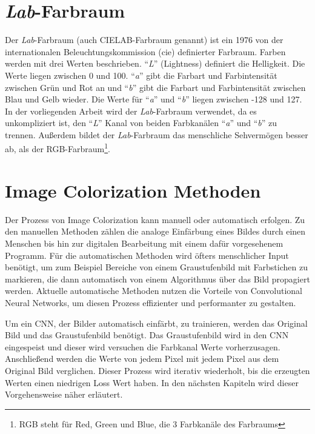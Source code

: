 \section{\textit{Lab}-Farbraum}
Der \textit{Lab}-Farbraum (auch CIELAB-Farbraum genannt) ist ein 1976 von der internationalen
Beleuchtungskommission (\gls{cie}) definierter Farbraum. Farben werden mit drei Werten beschrieben. ``\textit{L}'' (Lightness) definiert die Helligkeit.
Die Werte liegen zwischen 0 und 100. ``\textit{a}'' gibt die Farbart und Farbintensität zwischen Grün und Rot an und ``\textit{b}'' gibt die
Farbart und Farbintensität zwischen Blau und Gelb wieder. Die Werte für ``\textit{a}'' und ``\textit{b}'' liegen zwischen -128 und 127.
\\
In der vorliegenden Arbeit wird der \textit{Lab}-Farbraum verwendet, da es unkompliziert ist, den ``\textit{L}'' Kanal von beiden Farbkanälen
``\textit{a}'' und ``\textit{b}'' zu trennen. Außerdem bildet der \textit{Lab}-Farbraum das menschliche Sehvermögen besser ab, als der
RGB-Farbraum\footnote{RGB steht für Red, Green und Blue, die 3 Farbkanäle des Farbraums}.

\section{Image Colorization Methoden}
Der Prozess von Image Colorization kann manuell oder automatisch erfolgen. Zu den manuellen Methoden zählen die analoge Einfärbung eines Bildes
durch einen Menschen bis hin zur digitalen Bearbeitung mit einem dafür vorgesehenem Programm. Für die automatischen Methoden wird öfters menschlicher Input
benötigt, um zum Beispiel Bereiche von einem Graustufenbild mit Farbstichen zu markieren, die dann automatisch von einem Algorithmus über das Bild
propagiert werden. Aktuelle automatische Methoden nutzen die Vorteile von Convolutional Neural Networks, um diesen Prozess effizienter und performanter
zu gestalten.

Um ein CNN, der Bilder automatisch einfärbt, zu trainieren, werden das Original Bild und das Graustufenbild benötigt. Das Graustufenbild wird
in den CNN eingespeist und dieser wird versuchen die Farbkanal Werte vorherzusagen. Anschließend werden die Werte von jedem Pixel mit jedem Pixel
aus dem Original Bild verglichen. Dieser Prozess wird iterativ wiederholt, bis die erzeugten Werten einen niedrigen Loss Wert haben. In den
nächsten Kapiteln wird dieser Vorgehensweise näher erläutert.

